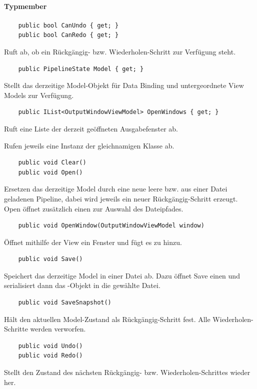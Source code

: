 \paragraph{Typmember}
\begin{itemize}

	\begin{verbatim}
	public bool CanUndo { get; }
	public bool CanRedo { get; }
	\end{verbatim}
	Ruft ab, ob ein Rückgängig- bzw. Wiederholen-Schritt zur Verfügung steht.

	\begin{verbatim}
	public PipelineState Model { get; }
	\end{verbatim}
	Stellt das derzeitige Model-Objekt für Data Binding und untergeordnete View Models zur Verfügung.

	\begin{verbatim}
	public IList<OutputWindowViewModel> OpenWindows { get; }
	\end{verbatim}
	Ruft eine Liste der derzeit geöffneten Ausgabefenster ab.


	Rufen jeweils eine Instanz der gleichnamigen Klasse ab.

	\begin{verbatim}
	public void Clear()
	public void Open()
	\end{verbatim}
	Ersetzen das derzeitige Model durch eine neue leere bzw. aus einer Datei geladenen Pipeline, dabei wird jeweils ein neuer Rückgängig-Schritt erzeugt. Open öffnet zusätzlich einen  zur Auswahl des Dateipfades.

	
	\begin{verbatim}
	public void OpenWindow(OutputWindowViewModel window)
	\end{verbatim}
	Öffnet mithilfe der View ein Fenster und fügt es zu  hinzu.

	\begin{verbatim}
	public void Save()
	\end{verbatim}
	Speichert das derzeitige Model in einer Datei ab. Dazu öffnet Save einen  und serialisiert dann das -Objekt in die gewählte Datei.

	\begin{verbatim}
	public void SaveSnapshot()
	\end{verbatim}
	Hält den aktuellen Model-Zustand als Rückgängig-Schritt fest. Alle Wiederholen-Schritte werden verworfen.

	\begin{verbatim}
	public void Undo()
	public void Redo()
	\end{verbatim}
	Stellt den Zustand des nächsten Rückgängig- bzw. Wiederholen-Schrittes wieder her.

\end{itemize}

